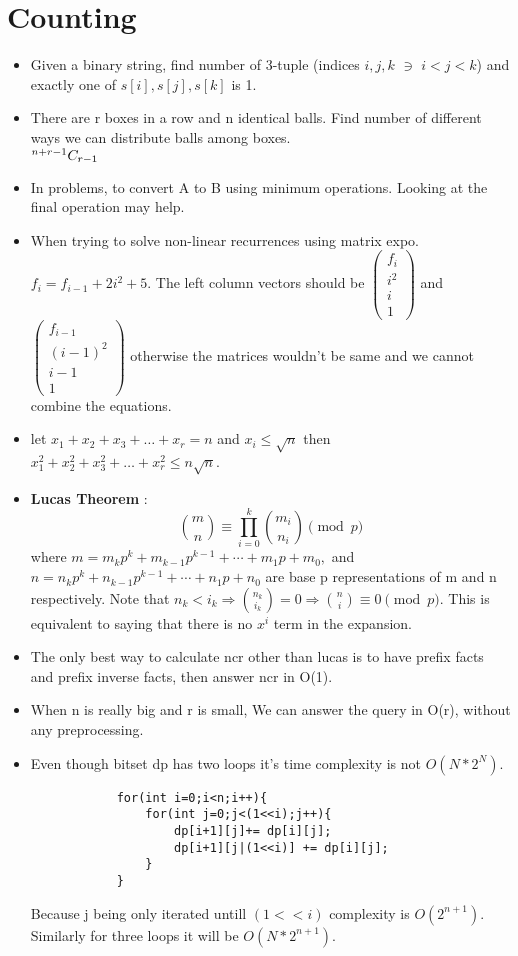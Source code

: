 \documentclass[../Notes.tex]{subfiles}
\begin{document}
\chapter{Counting}

\begin{itemize}
	\item Given a binary string, find number of 3-tuple (indices $i,j,k$ $\ni$ $i<j<k$) and exactly one of $s[i],s[j],s[k]$ is 1. 
	\item There are r boxes in a row and n identical balls. Find number of different ways we can distribute balls among boxes.\\
	${}^{n+r-1}C_{r-1}$
	\item In problems, to convert A to B using minimum operations. Looking at the final operation may help.
	\item When trying to solve non-linear recurrences using matrix expo.
	$f_i = f_{i - 1} + 2i^2 + 5$. The left column vectors should be
	$\begin{pmatrix} f_i\\ i^2\\ i\\ 1\end{pmatrix}$ and $\begin{pmatrix} f_{i-1}\\ (i-1)^2\\ i-1\\ 1\end{pmatrix}$ otherwise the matrices wouldn't be same and we cannot combine the equations.
	\item let $x_1+x_2+x_3+ \ldots +x_r = n$ and $x_i\leq \sqrt{n}$ then 
	$x_1^2+x_2^2+x_3^2+ \ldots +x_r^2 \leq n\sqrt{n}$.
	\item \textbf{Lucas Theorem} : $${\binom {m}{n}}\equiv \prod _{i=0}^{k}{\binom {m_{i}}{n_{i}}}{\pmod {p}}$$
	where $m=m_{k}p^{k}+m_{k-1}p^{k-1}+\cdots +m_{1}p+m_{0},$ and\\ 
	$n=n_{k}p^{k}+n_{k-1}p^{k-1}+\cdots +n_{1}p+n_{0}$ are base p representations of m and n respectively. Note that 
	$n_k<i_k\Longrightarrow\binom{n_k}{i_k}=0\Longrightarrow\binom{n}{i}\equiv 0 \pmod{p}$. This is equivalent to saying that there is no $x^i$ term in the expansion.
	\item The only best way to calculate ncr other than lucas is to have prefix facts and prefix inverse facts, then answer ncr in O(1).
	\item When n is really big and r is small, We can answer the query in O(r), without any preprocessing.
	\item Even though bitset dp has two loops it's time complexity is not $O(N*2^N)$.
		\begin{lstlisting}
			for(int i=0;i<n;i++){
				for(int j=0;j<(1<<i);j++){
					dp[i+1][j]+= dp[i][j];
					dp[i+1][j|(1<<i)] += dp[i][j];			
				}			
			}
		\end{lstlisting}
		Because j being only iterated untill $(1<<i)$ complexity is $O(2^{n+1})$. Similarly for three loops it will be $O(N*2^{n+1})$.
\end{itemize}
\end{document}
